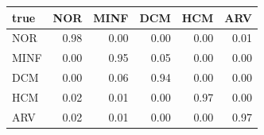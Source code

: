 \begin{tabular}{lrrrrr}
\toprule
true & NOR & MINF & DCM & HCM & ARV \\
\midrule
NOR & 0.98 & 0.00 & 0.00 & 0.00 & 0.01 \\
MINF & 0.00 & 0.95 & 0.05 & 0.00 & 0.00 \\
DCM & 0.00 & 0.06 & 0.94 & 0.00 & 0.00 \\
HCM & 0.02 & 0.01 & 0.00 & 0.97 & 0.00 \\
ARV & 0.02 & 0.01 & 0.00 & 0.00 & 0.97 \\
\bottomrule
\end{tabular}
